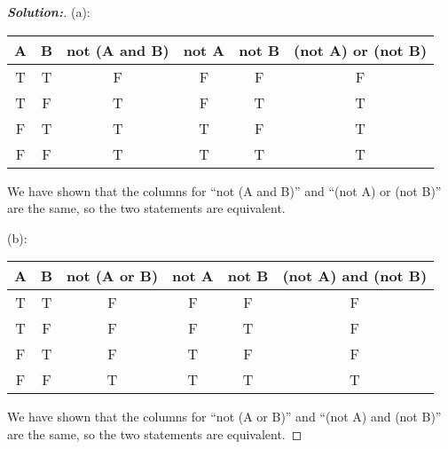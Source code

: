 \documentclass[12pt]{article}
\theoremstyle{definition}\newtheorem{problem}{Problem}
\newenvironment{solution}{\begin{proof}[\bfseries\textup{Solution:}]}{\end{proof}}
\begin{document}
\begin{solution} \quad \newline

(a): \begin{center} %
    \begin{tabular}{ c|c|c|c|c|c} %
    A & B & not (A and B) & not A & not B& (not A) or (not B)\\ %
    \hline %
    T & T & F&F&F&F \\ %
    T & F &T &F &T &T \\ 
    F & T &T &T &F & T\\ 
    F & F &T &T &T &T\\
    \end{tabular}
    \end{center}
We have shown that the columns for ``not (A and B)'' and ``(not A) or (not B)'' are the same, so the two statements are equivalent. 
\newline
    
(b): \begin{center}
    \begin{tabular}{ c|c|c|c|c|c}
    A & B & not (A or B) & not A & not B& (not A) and (not B)\\
    \hline
    T & T & F&F&F&F \\
    T & F &F &F &T &F \\
    F & T &F &T &F & F\\
    F & F &T &T &T &T\\

        
    \end{tabular}
\end{center}
We have shown that the columns for ``not (A or B)'' and ``(not A) and (not B)'' are the same, so the two statements are equivalent.

\end{solution}
\end{document}

